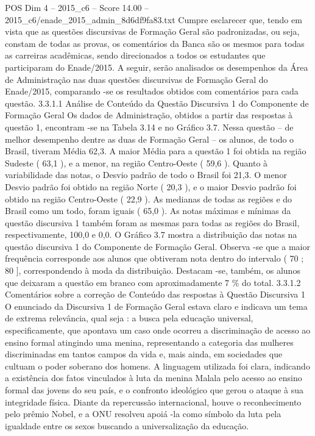 \begin{textsample}{POS Dim 4 – 2015\_c6 – Score 14.00 – 2015\_c6/enade\_2015\_admin\_8d6df9fa83.txt}
Cumpre esclarecer que, tendo em vista que as questões discursivas de Formação Geral são padronizadas, ou seja, constam de todas as provas, os comentários da Banca são os mesmos para todas as carreiras acadêmicas, sendo direcionados a todos os estudantes que participaram do Enade/2015.
A seguir, serão analisados os desempenhos da Área de Administração nas duas questões discursivas de Formação Geral do Enade/2015, comparando -se os resultados obtidos com comentários para cada questão. 3.3.1.1 Análise de Conteúdo da Questão Discursiva 1 do Componente de Formação Geral Os dados de Administração, obtidos a partir das respostas à questão 1, encontram -se na Tabela 3.14 e no Gráfico 3.7.
Nessa questão – de melhor desempenho dentre as duas de Formação Geral – os alunos, de todo o Brasil, tiveram Média 62,3.
A maior Média para a questão 1 foi obtida na região Sudeste ( 63,1 ), e a menor, na região Centro-Oeste ( 59,6 ).
Quanto à variabilidade das notas, o Desvio padrão de todo o Brasil foi 21,3.
O menor Desvio padrão foi obtido na região Norte ( 20,3 ), e o maior Desvio padrão foi obtido na região Centro-Oeste ( 22,9 ).
As medianas de todas as regiões e do Brasil como um todo, foram iguais ( 65,0 ).
As notas máximas e mínimas da questão discursiva 1 também foram as mesmas para todas as regiões do Brasil, respectivamente, 100,0 e 0,0.
O Gráfico 3.7 mostra a distribuição das notas na questão discursiva 1 do Componente de Formação Geral.
Observa -se que a maior frequência corresponde aos alunos que obtiveram nota dentro do intervalo ( 70 ; 80 ], correspondendo à moda da distribuição.
Destacam -se, também, os alunos que deixaram a questão em branco com aproximadamente 7 \% do total. 3.3.1.2 Comentários sobre a correção de Conteúdo das respostas à Questão Discursiva 1 O enunciado da Discursiva 1 de Formação Geral estava claro e indicava um tema de extrema relevância, qual seja : a busca pela educação universal, especificamente, que apontava um caso onde ocorreu a discriminação de acesso ao ensino formal atingindo uma menina, representando a categoria das mulheres discriminadas em tantos campos da vida e, mais ainda, em sociedades que cultuam o poder soberano dos homens.
A linguagem utilizada foi clara, indicando a existência dos fatos vinculados à luta da menina Malala pelo acesso ao ensino formal das jovens do seu país, e o confronto ideológico que gerou o ataque à sua integridade física.
Diante da repercussão internacional, houve o reconhecimento pelo prêmio Nobel, e a ONU resolveu apoiá -la como símbolo da luta pela igualdade entre os sexos buscando a universalização da educação.

\end{textsample}
